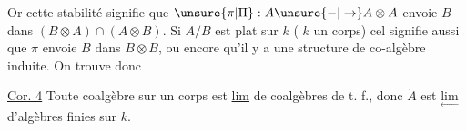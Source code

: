 Or cette stabilité  signifie que $\unsure{\pi|\Pi}:A\unsure{-|\to}A\otimes A$ envoie $B$ dans $(B\otimes A)\cap(A\otimes B)$. Si  $A/B$ est plat sur $k$ ( $k$ un corps) cel signifie aussi que $\pi$ envoie $B$ dans $B\otimes B$, ou encore qu'il y a une structure de co-algèbre induite. On trouve donc

\uline{Cor. 4} Toute coalgèbre  sur un corps est \uline{lim}  de coalgèbres de t. f., donc $\check A$ est $\underset{\leftarrow}{\mathrm{lim}}$  d'algèbres finies sur $k$.
